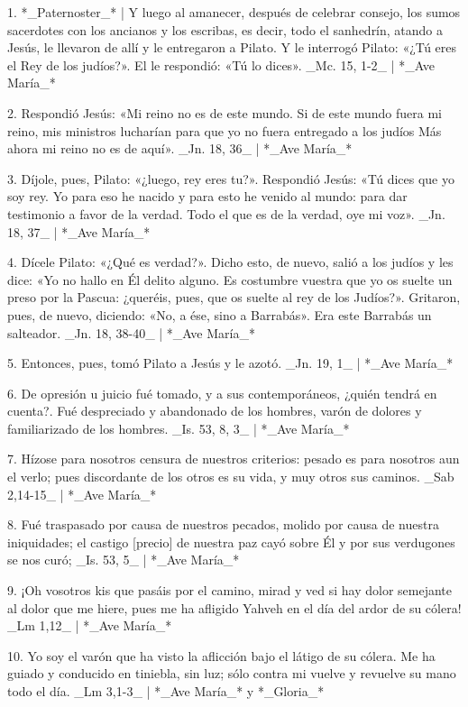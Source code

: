 1. *_Paternoster_* | Y luego al amanecer, después de celebrar consejo, los sumos sacerdotes con los ancianos y los escribas, es decir, todo el sanhedrín, atando a Jesús, le llevaron de allí y le entregaron a Pilato. Y le interrogó Pilato: «¿Tú eres el Rey de los judíos?». El le respondió: «Tú lo dices». _Mc. 15, 1-2_ | *_Ave María_*

2. Respondió Jesús: «Mi reino no es de este mundo. Si de este mundo fuera mi reino, mis ministros lucharían para que yo no fuera entregado a los judíos Más ahora mi reino no es de aquí». _Jn. 18, 36_ | *_Ave María_*

3. Díjole, pues, Pilato: «¿luego, rey eres tu?». Respondió Jesús: «Tú dices que yo soy rey. Yo para eso he nacido y para esto he venido al mundo: para dar testimonio a favor de la verdad. Todo el que es de la verdad, oye mi voz». _Jn. 18, 37_ | *_Ave María_*

4. Dícele Pilato: «¿Qué es verdad?». Dicho esto, de nuevo, salió a los judíos y les dice: «Yo no hallo en Él delito alguno. Es costumbre vuestra que yo os suelte un preso por la Pascua: ¿queréis, pues, que os suelte al rey de los Judíos?». Gritaron, pues, de nuevo, diciendo: «No, a ése, sino a Barrabás». Era este Barrabás un salteador. _Jn. 18, 38-40_ | *_Ave María_*

5. Entonces, pues, tomó Pilato a Jesús y le azotó. _Jn. 19, 1_ | *_Ave María_*

6. De opresión u juicio fué tomado, y a sus contemporáneos, ¿quién tendrá en cuenta?. Fué despreciado y abandonado de los hombres, varón de dolores y familiarizado de los hombres. _Is. 53, 8, 3_ | *_Ave María_*

7. Hízose para nosotros censura de nuestros criterios: pesado es para nosotros aun el verlo; pues discordante de los otros es su vida, y muy otros sus caminos. _Sab 2,14-15_ | *_Ave María_*

8. Fué traspasado por causa de nuestros pecados, molido por causa de nuestra iniquidades; el castigo [precio] de nuestra paz cayó sobre Él y por sus verdugones se nos curó; _Is. 53, 5_ | *_Ave María_*

9. ¡Oh vosotros kis que pasáis por el camino, mirad y ved si hay dolor semejante al dolor que me hiere, pues me ha afligido Yahveh en el día del ardor de su cólera! _Lm 1,12_ | *_Ave María_*

10. Yo soy el varón que ha visto la aflicción bajo el látigo de su cólera. Me ha guiado y conducido en tiniebla, sin luz; sólo contra mi vuelve y revuelve su mano todo el día. _Lm 3,1-3_ | *_Ave María_* y *_Gloria_*